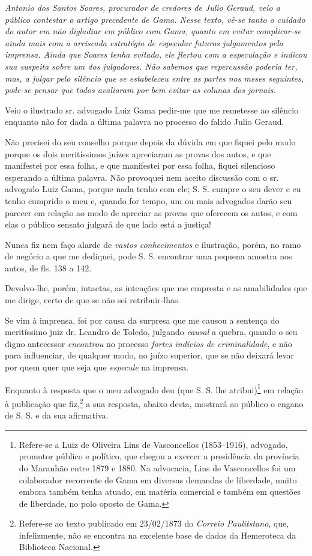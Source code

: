 \begin{didascalia}
\emph{Antonio dos Santos Soares, procurador de credores de Julio Geraud,
veio a público contestar o artigo precedente de Gama. Nesse texto, vê-se
tanto o cuidado do autor em não digladiar em público com Gama, quanto em
evitar complicar-se ainda mais com a arriscada estratégia de especular
futuros julgamentos pela imprensa. Ainda que Soares tenha evitado, ele
flertou com a especulação e indicou sua suspeita sobre um dos
julgadores. Não sabemos que repercussão poderia ter, mas, a julgar pelo
silêncio que se estabeleceu entre as partes nos meses seguintes, pode-se
pensar que todos avaliaram por bem evitar as colunas dos jornais.}
\end{didascalia}

\asterisc{}

Veio o ilustrado sr. advogado Luiz Gama pedir-me que me remetesse ao
silêncio enquanto não for dada a última palavra no processo do falido
Julio Geraud.

Não precisei do seu conselho porque depois da dúvida em que fiquei pelo
modo porque os dois meritíssimos juízes apreciaram as provas dos autos,
e que manifestei por essa folha, e que manifestei por essa folha, fiquei
silencioso esperando a última palavra. Não provoquei nem aceito
discussão com o sr. advogado Luiz Gama, porque nada tenho com ele; S. S.
cumpre o seu dever e eu tenho cumprido o meu e, quando for tempo, um ou
mais advogados darão seu parecer em relação ao modo de apreciar as
provas que oferecem os autos, e com elas o público sensato julgará de
que lado está a justiça!

Nunca fiz nem faço alarde de \emph{vastos conhecimentos} e ilustração,
porém, no ramo de negócio a que me dediquei, pode S. S. encontrar uma
pequena amostra nos autos, de fls. 138 a 142.

Devolvo-lhe, porém, intactas, as intenções que me empresta e as
amabilidades que me dirige, certo de que se não sei retribuir-lhas.

Se vim à imprensa, foi por causa da surpresa que me causou a sentença do
meritíssimo juiz dr. Leandro de Toledo, julgando \emph{causal} a quebra,
quando o seu digno antecessor \emph{encontrou} no processo \emph{fortes
indícios de criminalidade}, e não para influenciar, de qualquer modo, no
juízo superior, que se não deixará levar por quem quer que seja que
\emph{especule} na imprensa.

Enquanto à resposta que o meu advogado deu (que S. S. lhe
atribui)\footnote{ Refere-se a Luiz de Oliveira Lins de Vasconcellos
  (1853--1916), advogado, promotor público e político, que chegou a
  exercer a presidência da província do Maranhão entre 1879 e 1880. Na
  advocacia, Lins de Vasconcellos foi um colaborador recorrente de Gama
  em diversas demandas de liberdade, muito embora também tenha atuado,
  em matéria comercial e também em questões de liberdade, no polo oposto
  de Gama.} em relação à publicação que fiz,\footnote{ Refere-se ao
  texto publicado em 23/02/1873 do \emph{Correio Paulitstano}, que,
  infelizmente, não se encontra na excelente base de dados da Hemeroteca
  da Biblioteca Nacional.} a sua resposta, abaixo desta, mostrará ao
público o engano de S. S. e da sua afirmativa.

